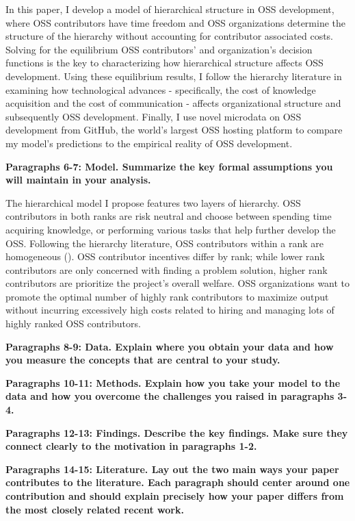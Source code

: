 \documentclass[12pt,notitlepage]{article}
\begin{document}
In this paper, I develop a model of hierarchical structure in OSS development, where OSS contributors have time freedom and OSS organizations determine the structure of the hierarchy without accounting for contributor associated costs. Solving for the equilibrium OSS contributors' and organization's decision functions is the key to characterizing how hierarchical structure affects OSS development. Using these equilibrium results, I follow the hierarchy literature in examining how technological advances - specifically, the cost of knowledge acquisition and the cost of communication - affects organizational structure and subsequently OSS development. Finally, I use novel microdata on OSS development from GitHub, the world's largest OSS hosting platform to compare my model's predictions to the empirical reality of OSS development. 

\textbf{Paragraphs 6-7: Model. Summarize the key formal assumptions you will maintain in your analysis.}

\qquad The hierarchical model I propose features two layers of hierarchy. OSS contributors in both ranks are risk neutral and choose between spending time acquiring knowledge, or performing various tasks that help further develop the OSS. Following the hierarchy literature, OSS contributors within a rank are homogeneous (\cite{garicano_hierarchies_2000}). OSS contributor incentives differ by rank; while lower rank contributors are only concerned with finding a problem solution, higher rank contributors are prioritize the project's overall welfare. OSS organizations want to promote the optimal number of highly rank contributors to maximize output without incurring excessively high costs related to hiring and managing lots of highly ranked OSS contributors. 

\textbf{Paragraphs 8-9: Data. Explain where you obtain your data and how you measure the concepts that are central to your study.}

\textbf{Paragraphs 10-11: Methods. Explain how you take your model to the data and how you overcome the challenges you raised in paragraphs 3-4.}

\textbf{Paragraphs 12-13: Findings. Describe the key findings. Make sure they connect clearly to the motivation in paragraphs 1-2.}

\textbf{Paragraphs 14-15: Literature. Lay out the two main ways your paper contributes to the literature. Each paragraph should center around one contribution and should explain precisely how your paper differs from the most closely related recent work.}
\end{document}
